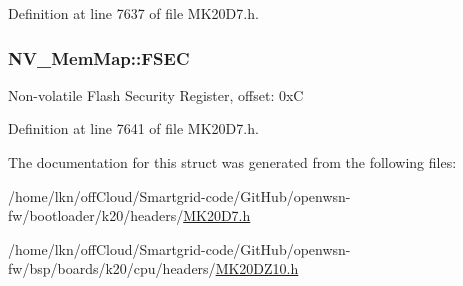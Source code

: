 Definition at line 7637 of file M\+K20\+D7.\+h.

\subsubsection[{\texorpdfstring{F\+S\+EC}{FSEC}}]{ N\+V\+\_\+\+Mem\+Map\+::\+F\+S\+EC}\hypertarget{struct_n_v___mem_map_acb89fbc884fb10887ef063d1aa892b29}{}\label{struct_n_v___mem_map_acb89fbc884fb10887ef063d1aa892b29}
Non-\/volatile Flash Security Register, offset\+: 0xC 

Definition at line 7641 of file M\+K20\+D7.\+h.



The documentation for this struct was generated from the following files\+:\begin{DoxyCompactItemize}
\item 
/home/lkn/off\+Cloud/\+Smartgrid-\/code/\+Git\+Hub/openwsn-\/fw/bootloader/k20/headers/\hyperlink{bootloader_2k20_2headers_2_m_k20_d7_8h}{M\+K20\+D7.\+h}\item 
/home/lkn/off\+Cloud/\+Smartgrid-\/code/\+Git\+Hub/openwsn-\/fw/bsp/boards/k20/cpu/headers/\hyperlink{_m_k20_d_z10_8h}{M\+K20\+D\+Z10.\+h}\end{DoxyCompactItemize}
